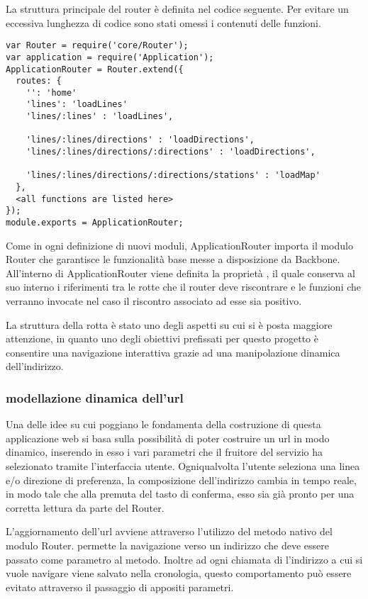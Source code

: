 La struttura principale del router è definita nel codice seguente. Per evitare un eccessiva lunghezza di codice sono stati omessi i contenuti delle funzioni.
{\small
\begin{verbatim}
var Router = require('core/Router');
var application = require('Application');
ApplicationRouter = Router.extend({
  routes: {
    '': 'home'
    'lines': 'loadLines'
    'lines/:lines' : 'loadLines',

    'lines/:lines/directions' : 'loadDirections',
    'lines/:lines/directions/:directions' : 'loadDirections',

    'lines/:lines/directions/:directions/stations' : 'loadMap'
  },
  <all functions are listed here>
});
module.exports = ApplicationRouter;
\end{verbatim}
}
\newpage
Come in ogni definizione di nuovi moduli, ApplicationRouter importa il modulo Router che garantisce le funzionalità base messe a disposizione da Backbone. 
All'interno di ApplicationRouter viene definita la proprietà , il quale conserva al suo interno i riferimenti tra le rotte che il router deve riscontrare e le funzioni che verranno invocate nel caso il riscontro associato ad esse sia positivo.

La struttura della rotta è stato uno degli aspetti su cui si è posta maggiore attenzione, in quanto uno degli obiettivi prefissati per questo progetto è consentire una navigazione interattiva grazie ad una manipolazione dinamica dell'indirizzo.

\subsubsection{modellazione dinamica dell'url} %
\label{ssub:modellazione_dinamica_dell_url}


Una delle idee su cui poggiano le fondamenta della costruzione di questa applicazione web si basa sulla possibilità di poter costruire un url in modo dinamico, inserendo in esso i vari parametri che il fruitore del servizio ha selezionato tramite l'interfaccia utente.
Ogniqualvolta l'utente seleziona una linea e/o direzione di preferenza, la composizione dell'indirizzo cambia in tempo reale, in modo tale che alla premuta del tasto di conferma, esso sia già pronto per una corretta lettura da parte del Router.

L'aggiornamento dell'url avviene attraverso l'utilizzo del metodo nativo  del modulo Router.  permette la navigazione verso un indirizzo che deve essere passato come parametro al metodo. Inoltre ad ogni chiamata di  l'indirizzo a cui si vuole navigare viene salvato nella cronologia, questo comportamento può essere evitato attraverso il passaggio di appositi parametri.

